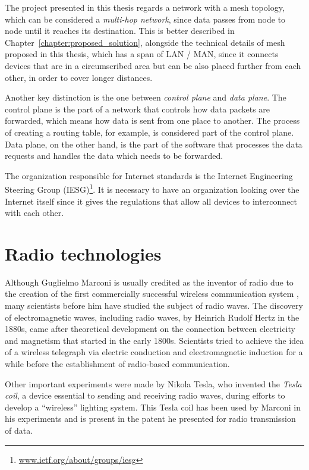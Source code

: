 		The project presented in this thesis regards a network with a mesh topology, which can be considered a \textit{multi-hop network}, since data passes from node to node until it reaches its destination.
		This is better described in Chapter~\ref{chapter:proposed_solution}, alongside the technical details of mesh proposed in this thesis, which has a span of LAN / MAN, since it connects devices that are in a circumscribed area but can be also placed further from each other, in order to cover longer distances.
			
		Another key distinction is the one between \textit{control plane} and \textit{data plane}.
		The control plane is the part of a network that controls how data packets are forwarded, which means how data is sent from one place to another.
		The process of creating a routing table, for example, is considered part of the control plane.
		Data plane, on the other hand, is the part of the software that processes the data requests and handles the data which needs to be forwarded.
			
		The organization responsible for Internet standards is the Internet Engineering Steering Group (IESG)\footnote{ \url{www.ietf.org/about/groups/iesg}}.
		It is necessary to have an organization looking over the Internet itself since it gives the regulations that allow all devices to interconnect with each other.
	
	\section{Radio technologies}\label{sec:radio_tech}
		
		Although Guglielmo Marconi is usually credited as the inventor of radio due to the creation of the first commercially successful wireless communication system \cite{4137304}, many scientists before him have studied the subject of radio waves.
		The discovery of electromagnetic waves, including radio waves, by Heinrich Rudolf Hertz in the 1880s, came after theoretical development on the connection between electricity and magnetism that started in the early 1800s.
		Scientists tried to achieve the idea of a wireless telegraph via electric conduction and electromagnetic induction for a while before the establishment of radio-based communication.
		
		Other important experiments were made by Nikola Tesla, who invented the \textit{Tesla coil}, a device essential to sending and receiving radio waves, during efforts to develop a ``wireless'' lighting system.
		This Tesla coil has been used by Marconi in his experiments and is present in the patent he presented for radio transmission of data.
		

